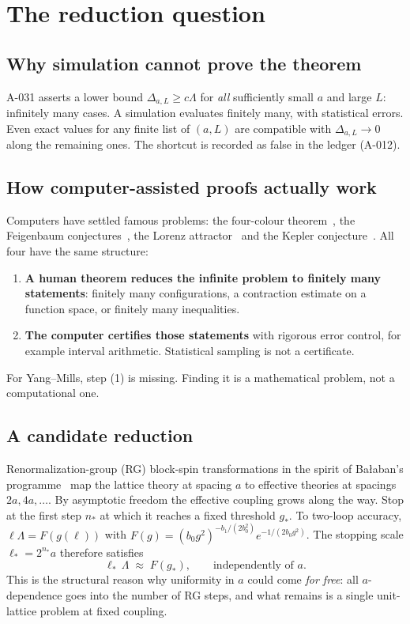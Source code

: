 \documentclass[11pt,a4paper]{article}
\newcommand{\idref}[1]{\textsf{#1}}
\begin{document}
\section{The reduction question}\label{sec:reduction}

\subsection{Why simulation cannot prove the theorem}
\idref{A-031} asserts a lower bound $\Delta_{a,L}\ge c\Lambda$ for \emph{all} sufficiently small $a$ and large $L$: infinitely many cases. A simulation evaluates finitely many, with statistical errors. Even exact values for any finite list of $(a,L)$ are compatible with $\Delta_{a,L}\to0$ along the remaining ones. The shortcut is recorded as false in the ledger (\idref{A-012}).

\subsection{How computer-assisted proofs actually work}
Computers have settled famous problems: the four-colour theorem~\cite{AH89}, the Feigenbaum conjectures~\cite{Lan82}, the Lorenz attractor~\cite{Tuc02} and the Kepler conjecture~\cite{Hal05}. All four have the same structure:
\begin{enumerate}[label=(\arabic*)]
\item \textbf{A human theorem reduces the infinite problem to finitely many statements}: finitely many configurations, a contraction estimate on a function space, or finitely many inequalities.
\item \textbf{The computer certifies those statements} with rigorous error control, for example interval arithmetic. Statistical sampling is not a certificate.
\end{enumerate}
For Yang--Mills, step (1) is missing. Finding it is a mathematical problem, not a computational one.

\subsection{A candidate reduction}
Renormalization-group (RG) block-spin transformations in the spirit of Ba{\l}aban's programme~\cite{Bal87,Bal88,Bal89a,Bal89b,Dim13a,Dim13b} map the lattice theory at spacing $a$ to effective theories at spacings $2a,4a,\dots$. By asymptotic freedom the effective coupling grows along the way. Stop at the first step $n_*$ at which it reaches a fixed threshold $g_*$. To two-loop accuracy, $\ell\Lambda=F(g(\ell))$ with $F(g)=(b_0g^2)^{-b_1/(2b_0^2)}e^{-1/(2b_0g^2)}$. The stopping scale $\ell_*=2^{n_*}a$ therefore satisfies
\[
\ell_*\,\Lambda\;\approx\;F(g_*),\qquad\text{independently of }a.
\]
This is the structural reason why uniformity in $a$ could come \emph{for free}: all $a$-dependence goes into the number of RG steps, and what remains is a single unit-lattice problem at fixed coupling.
\end{document}
